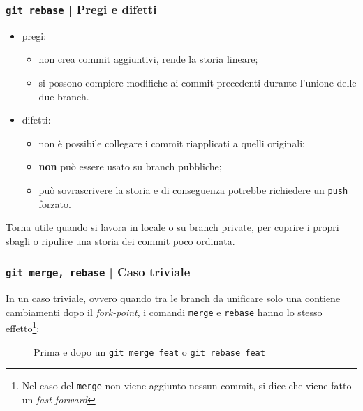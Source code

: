 \documentclass{beamer}
\begin{document}
\begin{frame}
  \frametitle{\texttt{git rebase} | Pregi e difetti}
  \begin{itemize}
    \item pregi: \begin{itemize}
      \item non crea commit aggiuntivi, rende la storia lineare;
      \item si possono compiere modifiche ai commit precedenti durante l'unione
        delle due branch.
    \end{itemize}
    \item difetti: \begin{itemize}
      \item non \`e possibile collegare i commit riapplicati a quelli originali;
      \item \textbf{non} pu\`o essere usato su branch pubbliche;
      \item pu\`o sovrascrivere la storia e di conseguenza potrebbe
        richiedere un \texttt{push} forzato.
    \end{itemize}
  \end{itemize}

  Torna utile quando si lavora in locale o su branch private, per coprire i
  propri sbagli o ripulire una storia dei commit poco ordinata.
\end{frame}

\begin{frame}
  \label{trivial}
  \frametitle{\texttt{git merge, rebase} | Caso triviale}
  In un caso triviale, ovvero quando tra le branch da unificare solo una contiene
  cambiamenti dopo il \emph{fork-point}, i comandi \texttt{merge} e \texttt{rebase}
  hanno lo stesso effetto\footnote{Nel caso del \texttt{merge} non viene
  aggiunto nessun commit, si dice che viene fatto un \emph{fast forward}}:
  \begin{figure}
    \centering
    \quad
    \caption{Prima e dopo un \texttt{git merge feat} o \texttt{git rebase feat}}
  \end{figure}
\end{frame}
\end{document}
